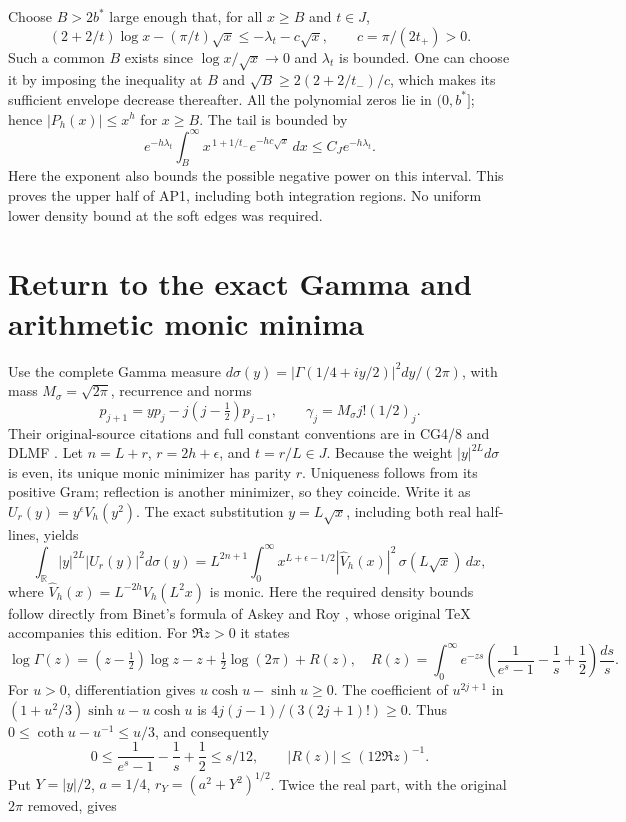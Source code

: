\documentclass[11pt]{article}
\begin{document}
Choose \(B>2b^*\) large enough that, for all \(x\ge B\) and \(t\in J\),
\[
(2+2/t)\log x-(\pi/t)\sqrt x
\le-\lambda_t-c\sqrt x,\qquad c=\pi/(2t_+)>0 .
\]
Such a common \(B\) exists since \(\log x/\sqrt x\to0\) and
\(\lambda_t\) is bounded. One can choose it by imposing the
inequality at \(B\) and
\(\sqrt B\ge 2(2+2/t_-)/c\), which makes its sufficient envelope
decrease thereafter. All the polynomial zeros lie in \((0,b^*]\);
hence \(|P_h(x)|\le x^h\) for \(x\ge B\).
The tail is bounded by
\[
e^{-h\lambda_t}\int_B^\infty
 x^{\,1+1/t_-}e^{-hc\sqrt x}\,dx
\le C_Je^{-h\lambda_t}.
\]
Here the exponent also bounds the possible negative power on this
interval. This proves the upper half of AP1, including both
integration regions. No uniform lower density bound at the soft
edges was required.

\section{Return to the exact Gamma and arithmetic monic minima}
Use the complete Gamma measure
\(d\sigma(y)=|\Gamma(1/4+iy/2)|^2dy/(2\pi)\),
with mass \(M_\sigma=\sqrt{2\pi}\), recurrence and norms
\[
p_{j+1}=yp_j-j(j-\tfrac12)p_{j-1},\qquad
\gamma_j=M_\sigma j!(1/2)_j .
\]
Their original-source citations and full constant conventions are
in CG4/8 and DLMF \cite{CG,DLMF}.
Let \(n=L+r\), \(r=2h+\epsilon\), and \(t=r/L\in J\).
Because the weight \(|y|^{2L}d\sigma\) is even, its unique monic
minimizer has parity \(r\). Uniqueness follows from its positive
Gram; reflection is another minimizer, so they coincide.
Write it as \(U_r(y)=y^\epsilon V_h(y^2)\).
The exact substitution \(y=L\sqrt x\), including both real
half-lines, yields
\[
\int_{\mathbb R}|y|^{2L}|U_r(y)|^2d\sigma(y)
=L^{2n+1}\int_0^\infty x^{L+\epsilon-1/2}
 |\widehat V_h(x)|^2\,\sigma(L\sqrt x)\,dx,
\]
where \(\widehat V_h(x)=L^{-2h}V_h(L^2x)\) is monic.
Here the required density bounds follow directly from Binet's formula
of Askey and Roy \cite{Binet}, whose original TeX accompanies this edition.
For $\Re z>0$ it states
\[
\log\Gamma(z)=(z-\tfrac12)\log z-z+\tfrac12\log(2\pi)+R(z),\quad
R(z)=\int_0^\infty e^{-zs}
\left(\frac1{e^s-1}-\frac1s+\frac12\right)\frac{ds}{s}.
\]
For $u>0$, differentiation gives $u\cosh u-\sinh u\ge0$.
The coefficient of $u^{2j+1}$ in
$(1+u^2/3)\sinh u-u\cosh u$ is
$4j(j-1)/(3(2j+1)!)\ge0$. Thus
$0\le\coth u-u^{-1}\le u/3$, and consequently
\[
0\le\frac1{e^s-1}-\frac1s+\frac12\le s/12,\qquad
|R(z)|\le(12\Re z)^{-1}.
\]
Put $Y=|y|/2$, $a=1/4$, $r_Y=(a^2+Y^2)^{1/2}$.
Twice the real part, with the original $2\pi$ removed, gives
\end{document}
